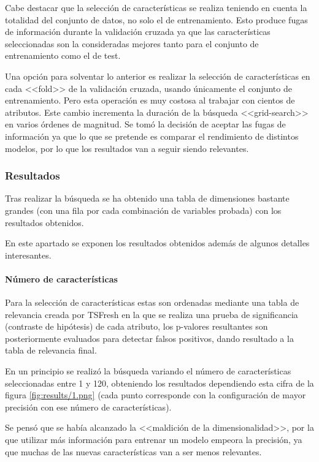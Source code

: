 Cabe destacar que la selección de características se realiza teniendo en cuenta
la totalidad del conjunto de datos, no solo el de entrenamiento. Esto produce
fugas de información durante la validación cruzada ya que las características
seleccionadas son la consideradas mejores tanto para el conjunto de
entrenamiento como el de test.

Una opción para solventar lo anterior es realizar la selección de
características en cada <<fold>> de la validación cruzada, usando únicamente el
conjunto de entrenamiento. Pero esta operación es muy costosa al trabajar con
cientos de atributos. Este cambio incrementa la duración de la búsqueda
<<grid-search>> en varios órdenes de magnitud. Se tomó la decisión de aceptar
las fugas de información ya que lo que se pretende es comparar el rendimiento de
distintos modelos, por lo que los resultados van a seguir siendo relevantes.

\subsubsection{Resultados}

Tras realizar la búsqueda se ha obtenido una tabla de dimensiones bastante
grandes (con una fila por cada combinación de variables probada) con los
resultados obtenidos.

En este apartado se exponen los resultados obtenidos además de algunos detalles
interesantes.

\paragraph{Número de características} Para la selección de características estas
son ordenadas mediante una tabla de relevancia creada por TSFresh en la que se
realiza una prueba de significancia (contraste de hipótesis) de cada atributo,
los p-valores resultantes son posteriormente evaluados para detectar falsos
positivos, dando resultado a la tabla de relevancia final.

En un principio se realizó la búsqueda variando el número de características
seleccionadas entre 1 y 120, obteniendo los resultados dependiendo esta cifra de
la figura \ref{fig:results/1.png} (cada punto corresponde con la configuración
de mayor precisión con ese número de características).


Se pensó que se había alcanzado la <<maldición de la dimensionalidad>>, por la
que utilizar más información para entrenar un modelo empeora la precisión, ya
que muchas de las nuevas características van a ser menos relevantes.

